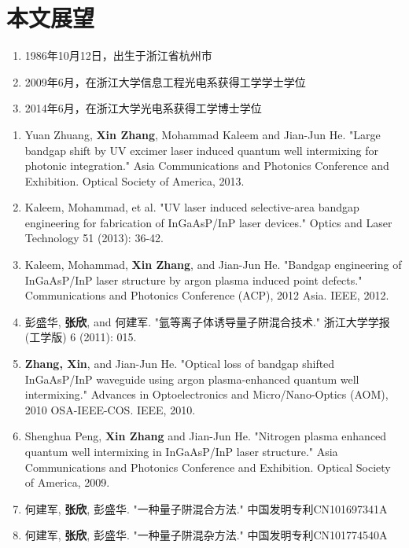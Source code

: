 \documentclass{ZJUthesis}
\begin{document}
\section{本文展望}

\ZJUbackmatter

\begin{resume}
\begin{enumerate}
\item{1986年10月12日，出生于浙江省杭州市}
\item{2009年6月，在浙江大学信息工程光电系获得工学学士学位}
\item{2014年6月，在浙江大学光电系获得工学博士学位}
\end{enumerate}
\end{resume}

\begin{publications}
\begin{enumerate}
\item{Yuan Zhuang, \textbf{Xin Zhang}, Mohammad Kaleem and Jian-Jun He. "Large bandgap shift by UV excimer laser induced quantum well intermixing for photonic integration." Asia Communications and Photonics Conference and Exhibition. Optical Society of America, 2013.}
\item{Kaleem, Mohammad, et al. "UV laser induced selective-area bandgap engineering for fabrication of InGaAsP/InP laser devices." Optics and Laser Technology 51 (2013): 36-42.}
\item{Kaleem, Mohammad, \textbf{Xin Zhang}, and Jian-Jun He. "Bandgap engineering of InGaAsP/InP laser structure by argon plasma induced point defects." Communications and Photonics Conference (ACP), 2012 Asia. IEEE, 2012.}
\item{彭盛华, \textbf{张欣}, and 何建军. "氩等离子体诱导量子阱混合技术." 浙江大学学报 (工学版) 6 (2011): 015.}
\item{\textbf{Zhang, Xin}, and Jian-Jun He. "Optical loss of bandgap shifted InGaAsP/InP waveguide using argon plasma-enhanced quantum well intermixing." Advances in Optoelectronics and Micro/Nano-Optics (AOM), 2010 OSA-IEEE-COS. IEEE, 2010.}
\item{Shenghua Peng, \textbf{Xin Zhang} and Jian-Jun He. "Nitrogen plasma enhanced quantum well intermixing in InGaAsP/InP laser structure." Asia Communications and Photonics Conference and Exhibition. Optical Society of America, 2009.}
\item{何建军, \textbf{张欣}, 彭盛华. "一种量子阱混合方法." 中国发明专利CN101697341A}
\item{何建军, \textbf{张欣}, 彭盛华. "一种量子阱混杂方法." 中国发明专利CN101774540A}
\end{enumerate}
\end{publications}
\end{document}
